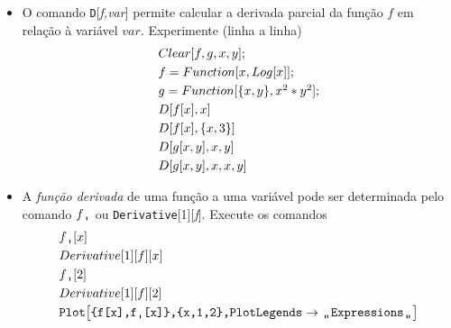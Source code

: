 \documentclass[11pt]{article}
\begin{document}
\begin{itemize}





\item[a)]  O comando \texttt{D}[\textsl{f,var}] permite calcular a derivada parcial da fun\c{c}\~ao $f$ em rela\c{c}\~ao \`a vari\'avel $var$. Experimente (linha a linha)
 \[\begin{array}{l}
 Clear[f, g, x, y];\vspace{1mm}\\
f = Function[x, Log[x]]; \vspace{1mm}\\
g = Function[\{x, y\},  x^2 \ast  y^2];\vspace{1mm}\\
D[f[x], x] \vspace{1mm}\\
 D[f[x], \{x, 3\}] \vspace{1mm}\\
D[g[x, y], x, y] \vspace{1mm}\\
 D[g[x, y], x, x, y]
\end{array}
\]


\item[b)]    A \textsl{fun\c{c}\~ao  derivada} de uma fun\c{c}\~ao  a uma vari\'avel pode ser determinada pelo comando  $f\texttt{\char"0D}$  ou \texttt{Derivative}[1][\textsl{f}].  Execute os comandos
 \[\begin{array}{l}
 f \texttt{\char"0D}[x]
  \vspace{1mm}\\ 
  Derivative[1][f][x]
 \vspace{1mm}\\f \texttt{\char"0D}[2]
   \vspace{1mm}\\ Derivative[1][f][2]  \vspace{1mm}\\ 
   \texttt{Plot\big[\{f[x],f}\texttt{\char"0D}\texttt{[x]\},\{x,1,2\},PlotLegends}  \rightarrow \texttt{\char"0D} \!\! \texttt{\char"0D} \texttt{Expressions} \texttt{\char"0D} \!\! \texttt{\char"0D} \texttt{\big]}

\end{array}
\]


\end{itemize}
\end{document}
